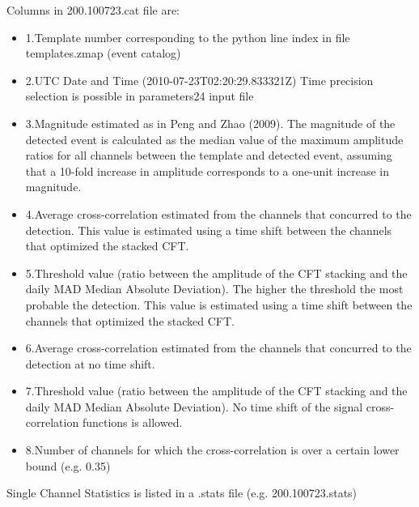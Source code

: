 \documentclass[a4paper,12pt,english]{sphinxmanual}
\begin{document}
Columns in 200.100723.cat file are:
\begin{itemize}
\item {} 
1.Template number corresponding to the python line index in file templates.zmap (event catalog)

\item {} 
2.UTC Date and Time (2010-07-23T02:20:29.833321Z) Time precision selection is possible in parameters24 input file

\item {} 
3.Magnitude estimated as in Peng and Zhao (2009). The magnitude of the detected event is calculated as the median value of the maximum amplitude ratios for all channels between the template and detected event, assuming that a 10-fold increase in amplitude corresponds to a one-unit increase in magnitude.

\item {} 
4.Average cross-correlation estimated from the channels that concurred to the detection. This value is estimated using a time shift between the channels that optimized the stacked CFT.

\item {} 
5.Threshold value (ratio between the amplitude of the CFT stacking and the daily MAD Median Absolute Deviation). The higher the threshold the most probable the detection. This value is estimated using a time shift between the channels that optimized the stacked CFT.

\item {} 
6.Average cross-correlation estimated from the channels that concurred to the detection at no time shift.

\item {} 
7.Threshold value (ratio between the amplitude of the CFT stacking and the daily MAD Median Absolute Deviation). No time shift of the signal cross-correlation functions is allowed.

\item {} 
8.Number of channels for which the cross-correlation is over a certain lower bound (e.g. 0.35)

\end{itemize}

Single Channel Statistics is listed in a .stats file (e.g. 200.100723.stats)
\end{document}
